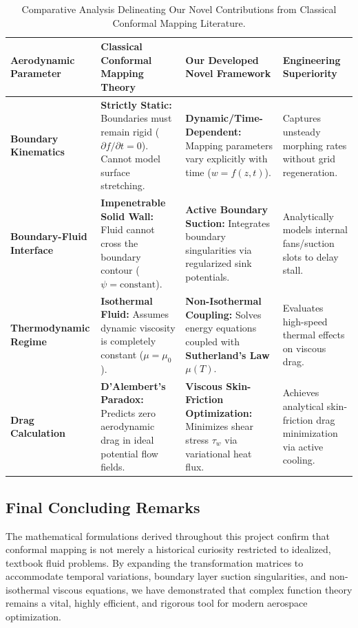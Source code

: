 \documentclass[12pt,a4paper]{article}
\begin{document}
\begin{table}[h!]
\centering
\small
\renewcommand{\arraystretch}{1.5}
\begin{tabular}{|p{3.2cm}|p{4.2cm}|p{4.2cm}|p{3.2cm}|}
\hline
\textbf{Aerodynamic Parameter} & \textbf{Classical Conformal Mapping Theory} & \textbf{Our Developed Novel Framework} & \textbf{Engineering Superiority} \\ \hline
\hline
\textbf{Boundary Kinematics} & \textbf{Strictly Static:} Boundaries must remain rigid ($\partial f/\partial t = 0$). Cannot model surface stretching. & \textbf{Dynamic/Time-Dependent:} Mapping parameters vary explicitly with time ($w = f(z,t)$). & Captures unsteady morphing rates without grid regeneration. \\ \hline
\textbf{Boundary-Fluid Interface} & \textbf{Impenetrable Solid Wall:} Fluid cannot cross the boundary contour ($\psi = \text{constant}$). & \textbf{Active Boundary Suction:} Integrates boundary singularities via regularized sink potentials. & Analytically models internal fans/suction slots to delay stall. \\ \hline
\textbf{Thermodynamic Regime} & \textbf{Isothermal Fluid:} Assumes dynamic viscosity is completely constant ($\mu = \mu_0$). & \textbf{Non-Isothermal Coupling:} Solves energy equations coupled with \textbf{Sutherland's Law} $\mu(T)$. & Evaluates high-speed thermal effects on viscous drag. \\ \hline
\textbf{Drag Calculation} & \textbf{D'Alembert's Paradox:} Predicts zero aerodynamic drag in ideal potential flow fields. & \textbf{Viscous Skin-Friction Optimization:} Minimizes shear stress $\tau_w$ via variational heat flux. & Achieves analytical skin-friction drag minimization via active cooling. \\ \hline
\end{tabular}
\caption{Comparative Analysis Delineating Our Novel Contributions from Classical Conformal Mapping Literature.}
\label{tab:comparison}
\end{table}

\subsection{Final Concluding Remarks}
The mathematical formulations derived throughout this project confirm that conformal mapping is not merely a historical curiosity restricted to idealized, textbook fluid problems. By expanding the transformation matrices to accommodate temporal variations, boundary layer suction singularities, and non-isothermal viscous equations, we have demonstrated that complex function theory remains a vital, highly efficient, and rigorous tool for modern aerospace optimization.
\end{document}
